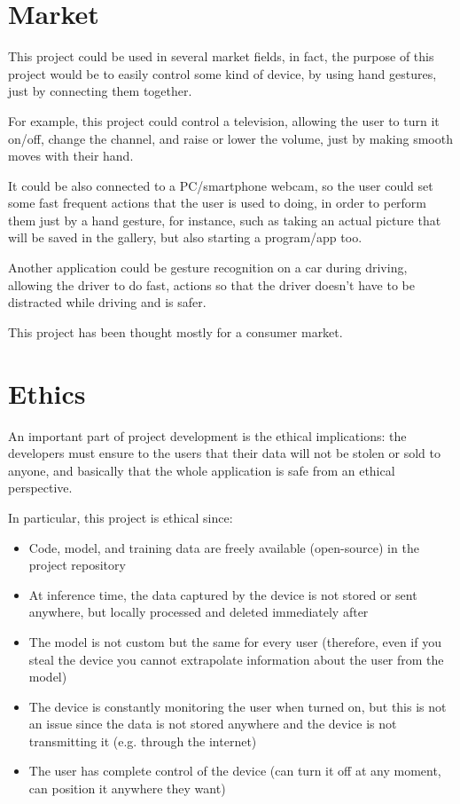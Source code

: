 \documentclass{Configuration_Files/PoliMi3i_thesis}
\begin{document}
\chapter{Market}
\label{ch:market}%
This project could be used in several market fields, in fact, the purpose of this project would be to easily control some kind of device, by using hand gestures, just by connecting them together.

For example, this project could control a television, allowing the user to turn it on/off, change the channel, and raise or lower the volume, just by making smooth moves with their hand.

It could be also connected to a PC/smartphone webcam, so the user could set some fast frequent actions that the user is used to doing, in order to perform them just by a hand gesture, for instance, such as taking an actual picture that will be saved in the gallery, but also starting a program/app too.

Another application could be gesture recognition on a car during driving, allowing the driver to do fast, actions so that the driver doesn't have to be distracted while driving and is safer.

This project has been thought mostly for a consumer market.

\chapter{Ethics}
\label{ch:ethics}%
An important part of project development is the ethical implications: the developers must ensure to the users that their data will not be stolen or sold to anyone, and basically that the whole application is safe from an ethical perspective.

In particular, this project is ethical since:
\begin{itemize}
    \item Code, model, and training data are freely available (open-source) in the project repository
    \item At inference time, the data captured by the device is not stored or sent anywhere, but locally processed and deleted immediately after
    \item The model is not custom but the same for every user (therefore, even if you steal the device you cannot extrapolate information about the user from the model)
    \item The device is constantly monitoring the user when turned on, but this is not an issue since the data is not stored anywhere and the device is not transmitting it (e.g. through the internet)
    \item The user has complete control of the device (can turn it off at any moment, can position it anywhere they want)
\end{itemize}
\end{document}
